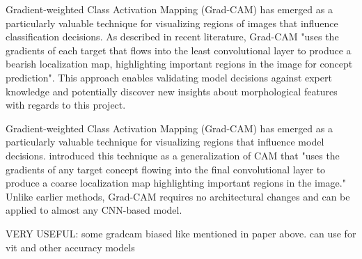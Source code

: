 \documentclass[a4paper,12pt]{report}
\begin{document}
Gradient-weighted Class Activation Mapping (Grad-CAM) has emerged as a particularly valuable technique for visualizing regions of images that influence classification decisions. As described in recent literature, Grad-CAM "uses the gradients of each target that flows into the least convolutional layer to produce a bearish localization map, highlighting important regions in the image for concept prediction"\citep{Hasibuan2023Large}. This approach enables validating model decisions against expert knowledge and potentially discover new insights about morphological features with regards to this project.



Gradient-weighted Class Activation Mapping (Grad-CAM) has emerged as a particularly valuable technique for visualizing regions that influence model decisions. \citep{selvaraju2017grad} introduced this technique as a generalization of CAM that "uses the gradients of any target concept flowing into the final convolutional layer to produce a coarse localization map highlighting important regions in the image." Unlike earlier methods, Grad-CAM requires no architectural changes and can be applied to almost any CNN-based model.

VERY USEFUL: some gradcam biased like mentioned in paper above. can use for vit and other accuracy models
\end{document}

